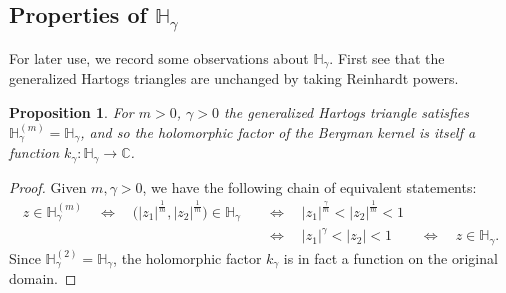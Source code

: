 \documentclass[letterpaper,11pt,reqno]{amsart}
\theoremstyle{plain}
\newtheorem{proposition}[equation]{Proposition}
\theoremstyle{definition}
\theoremstyle{remark}
\theoremstyle{remark}
\numberwithin{equation}{section}
\newcommand{\C}{{\mathbb C}}
\newcommand{\h}{{\mathbb H}}
\begin{document}
\subsection{Properties of $\h_\gamma$}

For later use, we record some observations about $\h_\gamma$.
First see that the generalized Hartogs triangles are  unchanged by taking Reinhardt powers.

\begin{proposition}\label{P:gen-Hartogs-are-their-own-Reinhardt-powers}
For $m>0$, $\gamma>0$ the generalized Hartogs triangle satisfies $\h_\gamma^{(m)} = \h_\gamma$, and so the holomorphic factor of the Bergman kernel is itself a function $k_\gamma : \h_\gamma \to \C$.
\end{proposition}
\begin{proof}
Given $m, \gamma > 0$, we have the following chain of equivalent statements:
\begin{align*}
z \in \h_{\gamma}^{(m)} \quad \Longleftrightarrow \quad \big(|z_1|^{\frac{1}{m}},|z_2|^{\frac{1}{m}}\big) \in \h_\gamma \quad &\Longleftrightarrow \quad |z_1|^{\frac{\gamma}{m}} < |z_2|^{\frac{1}{m}}  < 1 \\
&\Longleftrightarrow \quad |z_1|^\gamma < |z_2|  < 1 \qquad \Longleftrightarrow \quad z \in \h_\gamma.
\end{align*}
Since $\h_{\gamma}^{(2)} = \h_\gamma$, the holomorphic factor $k_\gamma$ is in fact a function on the original domain.
\end{proof}
\end{document}
